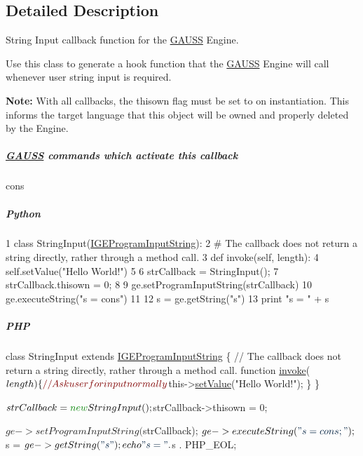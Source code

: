 \subsection{Detailed Description}
String Input callback function for the \hyperlink{class_g_a_u_s_s}{G\-A\-U\-S\-S} Engine. 

Use this class to generate a hook function that the \hyperlink{class_g_a_u_s_s}{G\-A\-U\-S\-S} Engine will call whenever user string input is required.

{\bfseries Note\-:} With all callbacks, the {\ttfamily thisown} flag must be set to {} on instantiation. This informs the target language that this object will be owned and properly deleted by the Engine.

\subparagraph*{\hyperlink{class_g_a_u_s_s}{G\-A\-U\-S\-S} commands which activate this callback}


\begin{DoxyItemize}
\item {\ttfamily cons}
\end{DoxyItemize}

\subparagraph*{Python}


\begin{DoxyCode}
1 \textcolor{keyword}{class }StringInput(\hyperlink{class_i_g_e_program_input_string}{IGEProgramInputString}):
2     \textcolor{comment}{# The callback does not return a string directly, rather through a method call.}
3     \textcolor{keyword}{def }invoke(self, length):
4         self.setValue(\textcolor{stringliteral}{"Hello World!"})
5 
6 strCallback = StringInput();
7 strCallback.thisown = 0;
8 
9 ge.setProgramInputString(strCallback)
10 ge.executeString(\textcolor{stringliteral}{"s = cons"})
11 
12 s = ge.getString(\textcolor{stringliteral}{"s"})
13 \textcolor{keywordflow}{print} \textcolor{stringliteral}{"s = "} + s
\end{DoxyCode}


\subparagraph*{P\-H\-P}


\begin{DoxyCode}
\textcolor{keyword}{class }StringInput \textcolor{keyword}{extends} \hyperlink{class_i_g_e_program_input_string}{IGEProgramInputString} \{
    \textcolor{comment}{// The callback does not return a string directly, rather through a method call.}
    \textcolor{keyword}{function} \hyperlink{class_i_g_e_program_input_string_aff170652d98f6a992a27134a7c674e01}{invoke}($length) \{
        \textcolor{comment}{// Ask user for input normally}
        $this->\hyperlink{class_i_g_e_program_input_string_ac692d94b650c29fe8d82690c78003be6}{setValue}(\textcolor{stringliteral}{"Hello World!"});
    \}
\}

$strCallback = \textcolor{keyword}{new} StringInput();
$strCallback->thisown = 0;

$ge->setProgramInputString($strCallback);
$ge->executeString(\textcolor{stringliteral}{"s = cons;"});

$s = $ge->getString(\textcolor{stringliteral}{"s"});
echo \textcolor{stringliteral}{"s = "} . $s . PHP\_EOL;
\end{DoxyCode}


